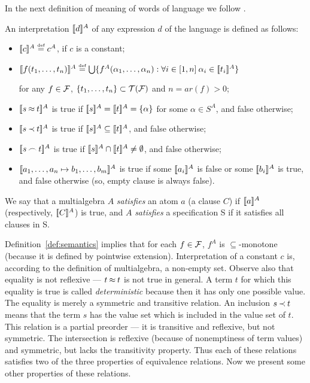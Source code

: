 In the next definition of meaning of words of language we follow \cite{MW,Mich}.

\begin{DEFINITION} \label{def:semantics}
An interpretation
\(\Interpret d\) of any expression $d$ of the language is defined as follows: 
\begin{itemize}\MyLPar
\item \(\Interpret c \Def c^A\), if $c$ is a constant;
\item \(\Interpret{f(\List tn,)} \Def \bigcup\{f^A(\List\alpha n,): \forall
  i\in[1,n]\:\alpha_i\in\Interpret {t_i}\}\) 

for any \(f\in \Funcs\), \(\{\List
  tn,\}\subset \Terms\Funcs\) and \(n=ar(f)>0\);
\item \(\Interpret{s\Eq t}\) is true if \(\Interpret s=\Interpret
  t=\{\alpha\}\) for some $\alpha\in S^A$, and false otherwise;
\item \(\Interpret{s\Incl t}\) is true if \(\Interpret s\subseteq\Interpret
  t\), and false otherwise;
\item \(\Interpret{s\Int t}\) is true if \(\Interpret s\cap \Interpret
  t \ne \es\), and false otherwise;
\item \(\Interpret{\List an,\Seq \List bm,}\) is true if some
  \(\Interpret{a_i}\) is false or some \(\Interpret{b_i}\) is true, and false
  otherwise (so, empty clause is always false). 
\end{itemize}

\end{DEFINITION}

We say that a multialgebra $A$ {\em satisfies} an atom $a$ (a clause $C$) if
\(\Interpret a\) (respectively, \(\Interpret C\)) is true, and $A$ {\em
satisfies} a specification \C S if it satisfies all clauses in \C S.

Definition~\ref {def:semantics} implies that for each \(f\in \Funcs\), \(f^A\)
is \(\subseteq\)-monotone (because it is defined by pointwise extension).
Interpretation of a constant $c$ is, according to the definition of
multialgebra, a non-empty set. Observe also that equality is not reflexive ---
\(t\Eq t\) is not true in general. A term $t$ for which this equality is true
is called {\em deterministic} because then it has only one possible value. The
equality is merely a symmetric and transitive relation. An inclusion \(s\Incl
t\) means that the term $s$ has the value set which is included in the value
set of $t$. This relation is a partial preorder --- it is transitive and
reflexive, but not symmetric. The intersection is reflexive (because of
nonemptiness of term values) and symmetric, but lacks the transitivity
property. Thus each of these relations satisfies two of the three properties
of equivalence relations.  Now we present some other properties of these
relations.

